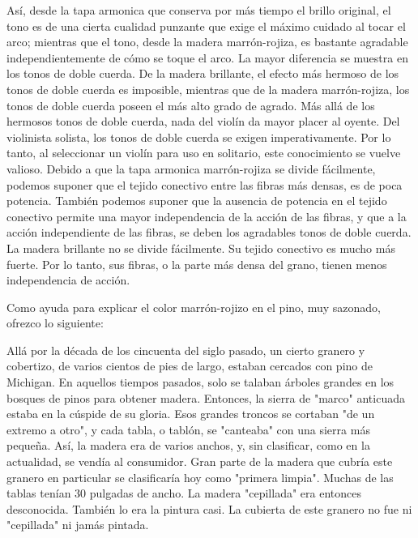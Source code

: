 \documentclass[12pt]{book}
\begin{document}
Así, desde la tapa armonica que conserva por más tiempo el brillo original, el tono es de una cierta cualidad punzante que exige el máximo cuidado al tocar el arco; mientras que el tono, desde la madera marrón-rojiza, es bastante agradable independientemente de cómo se toque el arco. La mayor diferencia se muestra en los tonos de doble cuerda. De la madera brillante, el efecto más hermoso de los tonos de doble cuerda es imposible, mientras que de la madera marrón-rojiza, los tonos de doble cuerda poseen el más alto grado de agrado. Más allá de los hermosos tonos de doble cuerda, nada del violín da mayor placer al oyente. Del violinista solista, los tonos de doble cuerda se exigen imperativamente. Por lo tanto, al seleccionar un violín para uso en solitario, este conocimiento se vuelve valioso. Debido a que la tapa armonica marrón-rojiza se divide fácilmente, podemos suponer que el tejido conectivo entre las fibras más densas, es de poca potencia. También podemos suponer que la ausencia de potencia en el tejido conectivo permite una mayor independencia de la acción de las fibras, y que a la acción independiente de las fibras, se deben los agradables tonos de doble cuerda. La madera brillante no se divide fácilmente. Su tejido conectivo es mucho más fuerte. Por lo tanto, sus fibras, o la parte más densa del grano, tienen menos independencia de acción.

Como ayuda para explicar el color marrón-rojizo en el pino, muy sazonado, ofrezco lo siguiente:

Allá por la década de los cincuenta del siglo pasado, un cierto granero y cobertizo, de varios cientos de pies de largo, estaban cercados con pino de Michigan. En aquellos tiempos pasados, solo se talaban árboles grandes en los bosques de pinos para obtener madera. Entonces, la sierra de "marco" anticuada estaba en la cúspide de su gloria. Esos grandes troncos se cortaban "de un extremo a otro", y cada tabla, o tablón, se "canteaba" con una sierra más pequeña. Así, la madera era de varios anchos, y, sin clasificar, como en la actualidad, se vendía al consumidor. Gran parte de la madera que cubría este granero en particular se clasificaría hoy como "primera limpia". Muchas de las tablas tenían 30 pulgadas de ancho. La madera "cepillada" era entonces desconocida. También lo era la pintura casi. La cubierta de este granero no fue ni "cepillada" ni jamás pintada.
\end{document}
